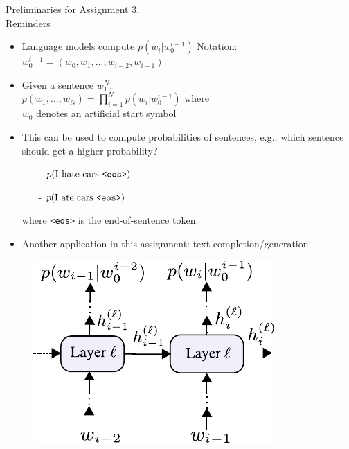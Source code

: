 \begin{frame}{Preliminaries for Assignment 3,\\ Reminders}
\begin{minipage}{0.6\linewidth}
\begin{itemize}
\item Language models compute $p(w_i | w_0^{i-1})$ Notation: $w_0^{i-1} = (w_0, w_1, ..., w_{i-2}, w_{i-1})$
\item Given a sentence $w_1^N$,\\
$\displaystyle p(w_1, ..., w_N) = \prod_{i=1}^{N} p(w_i | w_0^{i-1})$
where\\ $w_0$ denotes an artificial start symbol
\item This can be used to compute probabilities of sentences,
e.g., which sentence should get a higher probability?
\begin{itemize}
\item[-] $p(\text{I hate cars \texttt{<eos>}})$
\item[-] $p(\text{I ate cars \texttt{<eos>}})$
\end{itemize}
where \texttt{<eos>} is the end-of-sentence token.
\item Another application in this assignment: text completion/generation.
\end{itemize}
\end{minipage}
\begin{minipage}{0.35\linewidth}
\begin{figure}
\centering
\includegraphics[width=1.\linewidth]{./figures/lm.pdf}
\end{figure}
\end{minipage}
\end{frame}

